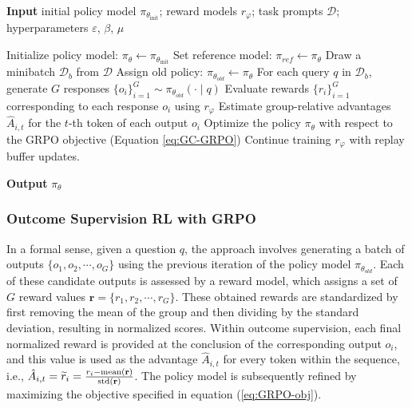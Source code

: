 \begin{itemize}[topsep=0pt]
\begin{itemize}[topsep=0pt]
\begin{algorithm}[t]
  \small
  \caption{Iterative Group Relative Policy Optimization}
  \textbf{Input} initial policy model $\pi_{\theta_{\text{init}}}$; reward models $r_\varphi$; task prompts $\mathcal{D}$; 
  hyperparameters $\varepsilon$, $\beta$, $\mu$
  \begin{algorithmic}[1]
    \State Initialize policy model: $\pi_\theta \leftarrow \pi_{\theta_{\text{init}}}$
      \State Set reference model: $\pi_{ref} \leftarrow \pi_{\theta}$
      \State Draw a minibatch $\mathcal{D}_b$ from $\mathcal{D}$
      \State Assign old policy: $\pi_{\theta_{old}} \leftarrow \pi_{\theta}$
      \State For each query $q$ in $\mathcal{D}_b$, generate $G$ responses $\{o_i\}_{i=1}^G \sim \pi_{\theta_{old}} (\cdot \mid q)$
      \State Evaluate rewards $\{r_i\}_{i=1}^{G}$ corresponding to each response $o_i$ using $r_{\varphi}$
      \State Estimate group-relative advantages $\hat{A}_{i,t}$ for the $t$-th token of each output $o_i$
        \State Optimize the policy $\pi_{\theta}$ with respect to the GRPO objective (Equation \ref{eq:GC-GRPO})
      \EndFor
    \EndFor
    \State Continue training $r_\varphi$ with replay buffer updates.
    \EndFor
  \end{algorithmic}
  \textbf{Output} $\pi_\theta$
  \label{alg:iter-grpo}
\end{algorithm}

\subsubsection{Outcome Supervision RL with GRPO} In a formal sense, given a question $q$, the approach involves generating a batch of outputs $\{o_1, o_2, \cdots, o_G\}$ using the previous iteration of the policy model $\pi_{\theta_{old}}$. Each of these candidate outputs is assessed by a reward model, which assigns a set of $G$ reward values $\mathbf{r}=\{r_1, r_2, \cdots, r_G\}$. These obtained rewards are standardized by first removing the mean of the group and then dividing by the standard deviation, resulting in normalized scores. Within outcome supervision, each final normalized reward is provided at the conclusion of the corresponding output $o_i$, and this value is used as the advantage $\hat{A}_{i, t}$ for every token within the sequence, i.e., $\hat{A}_{i, t} = \widetilde{r}_i = \frac{r_i- {\rm mean}(\mathbf{r})}{{\rm std}(\mathbf{r})}$. The policy model is subsequently refined by maximizing the objective specified in equation (\ref{eq:GRPO-obj}).


\end{itemize}
\end{itemize}

